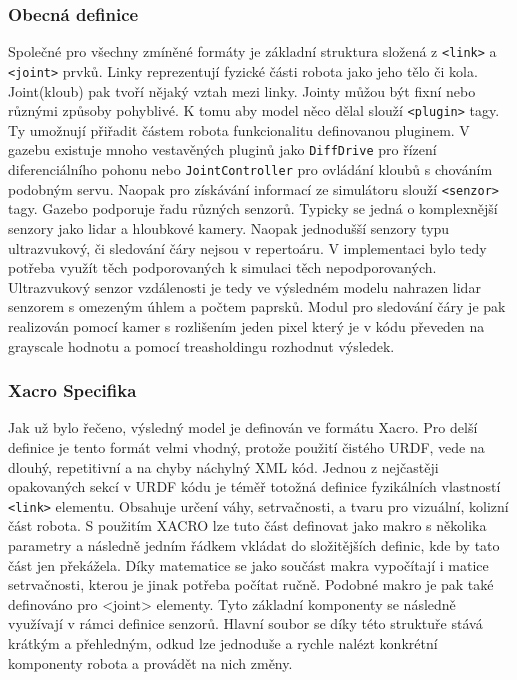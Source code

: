\subsubsection*{Obecná definice}
Společné pro všechny zmíněné formáty je základní struktura složená z \verb|<link>| a \verb|<joint>| prvků. Linky reprezentují fyzické části robota jako jeho tělo či kola. Joint(kloub) pak tvoří nějaký vztah mezi linky. Jointy můžou být fixní nebo různými způsoby pohyblivé. K tomu aby model něco dělal slouží \verb|<plugin>| tagy. Ty umožnují přiřadit částem robota funkcionalitu definovanou pluginem. V gazebu existuje mnoho vestavěných pluginů jako \verb|DiffDrive| pro řízení diferenciálního pohonu nebo \verb|JointController| pro ovládání kloubů s chováním podobným servu. Naopak pro získávání informací ze simulátoru slouží \verb|<senzor>| tagy. Gazebo podporuje řadu různých senzorů. Typicky se jedná o komplexnější senzory jako lidar a hloubkové kamery. Naopak jednodušší senzory typu ultrazvukový, či sledování čáry nejsou v repertoáru. V implementaci bylo tedy potřeba využít těch podporovaných k simulaci těch nepodporovaných. Ultrazvukový senzor vzdálenosti je tedy ve výsledném modelu nahrazen lidar senzorem s omezeným úhlem a počtem paprsků. Modul pro sledování čáry je pak realizován pomocí kamer s rozlišením jeden pixel který je v kódu převeden na grayscale hodnotu a pomocí treasholdingu rozhodnut výsledek.

\subsubsection*{Xacro Specifika}
Jak už bylo řečeno, výsledný model je definován ve formátu Xacro. Pro delší definice je tento formát velmi vhodný, protože použití čistého URDF, vede na dlouhý, repetitivní a na chyby náchylný XML kód. Jednou z nejčastěji opakovaných sekcí v URDF kódu je téměř totožná definice fyzikálních vlastností \verb|<link>| elementu. Obsahuje určení váhy, setrvačnosti, a tvaru pro vizuální, kolizní část robota. S použitím XACRO lze tuto část definovat jako makro s několika parametry a následně jedním řádkem vkládat do složitějších definic, kde by tato část jen překážela. Díky matematice se jako součást makra vypočítají i matice setrvačnosti, kterou je jinak potřeba počítat ručně. Podobné makro je pak také definováno pro <joint> elementy. Tyto základní komponenty se následně využívají v rámci definice senzorů. Hlavní soubor se díky této struktuře stává krátkým a přehledným, odkud lze jednoduše a rychle nalézt konkrétní komponenty robota a provádět na nich změny.

